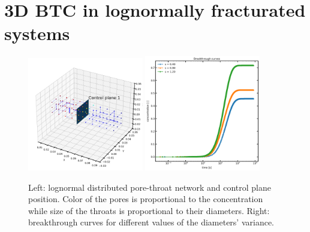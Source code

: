 \documentclass{article}
\begin{document}
\FloatBarrier  %
\section{3D BTC in lognormally fracturated systems}
\begin{figure}[htbp!]
    \centering
    \includegraphics[width=0.45\textwidth]{images/fromOpenPNM/logNorm3Ddiam.png}
    \hspace{0.05\textwidth}
    \includegraphics[width=0.45\textwidth]{images/fromOpenPNM/logNorm3Dbtc.png}
    \caption{Left: lognormal distributed pore-throat network and control plane position. Color of the pores is proportional to the concentration while size of the throats is proportional to their diameters. Right: breakthrough curves for different values of the diameters' variance.}
    \label{fig:3DlognormalDiam}
\end{figure}
\end{document}
